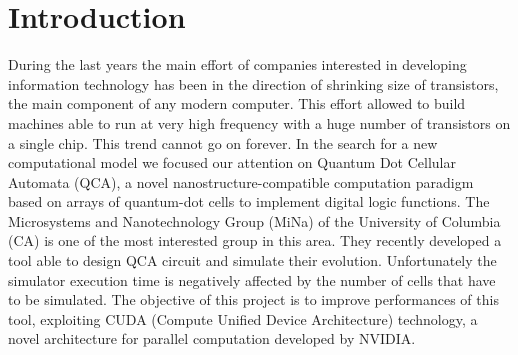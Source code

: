 \chapter{Introduction}\label{chap:intro}
During the last years the main effort of companies interested in developing information technology has been in the direction of shrinking size of transistors, the main component of any modern computer. This effort allowed to build machines able to run at very high frequency with a huge number of transistors on a single chip.  This trend cannot go on forever. In the search for a new computational model we focused our attention on Quantum Dot Cellular Automata (QCA), a novel nanostructure-compatible computation paradigm based on arrays of quantum-dot cells to implement digital logic functions.\newline
The  Microsystems and Nanotechnology Group (MiNa) of the University of Columbia (CA) is one of the most interested group in this area. They recently developed a tool able to design QCA circuit and simulate their evolution. Unfortunately the simulator execution time is negatively affected by the number of cells that have to be simulated.
The objective of this project is to improve performances of this tool, exploiting CUDA (Compute Unified Device Architecture) technology, a novel architecture for parallel computation developed by NVIDIA.